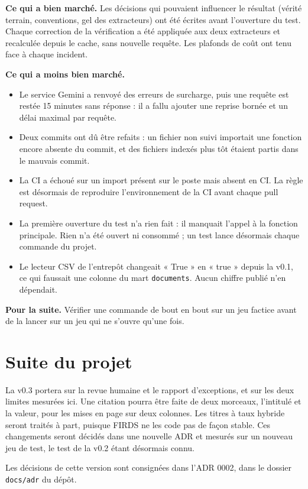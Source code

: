 \documentclass[11pt,a4paper]{article}
\begin{document}
\textbf{Ce qui a bien marché.} Les décisions qui pouvaient influencer le résultat (vérité terrain, conventions, gel des extracteurs) ont été écrites avant l'ouverture du test. Chaque correction de la vérification a été appliquée aux deux extracteurs et recalculée depuis le cache, sans nouvelle requête. Les plafonds de coût ont tenu face à chaque incident.

\textbf{Ce qui a moins bien marché.}
\begin{itemize}
  \item Le service Gemini a renvoyé des erreurs de surcharge, puis une requête est restée 15 minutes sans réponse : il a fallu ajouter une reprise bornée et un délai maximal par requête.
  \item Deux commits ont dû être refaits : un fichier non suivi importait une fonction encore absente du commit, et des fichiers indexés plus tôt étaient partis dans le mauvais commit.
  \item La CI a échoué sur un import présent sur le poste mais absent en CI. La règle est désormais de reproduire l'environnement de la CI avant chaque pull request.
  \item La première ouverture du test n'a rien fait : il manquait l'appel à la fonction principale. Rien n'a été ouvert ni consommé ; un test lance désormais chaque commande du projet.
  \item Le lecteur CSV de l'entrepôt changeait « True » en « true » depuis la v0.1, ce qui faussait une colonne du mart \texttt{documents}. Aucun chiffre publié n'en dépendait.
\end{itemize}

\textbf{Pour la suite.} Vérifier une commande de bout en bout sur un jeu factice avant de la lancer sur un jeu qui ne s'ouvre qu'une fois.

\section{Suite du projet}

La v0.3 portera sur la revue humaine et le rapport d'exceptions, et sur les deux limites mesurées ici. Une citation pourra être faite de deux morceaux, l'intitulé et la valeur, pour les mises en page sur deux colonnes. Les titres à taux hybride seront traités à part, puisque FIRDS ne les code pas de façon stable. Ces changements seront décidés dans une nouvelle ADR et mesurés sur un nouveau jeu de test, le test de la v0.2 étant désormais connu.

Les décisions de cette version sont consignées dans l'ADR 0002, dans le dossier \texttt{docs/adr} du dépôt.
\end{document}
